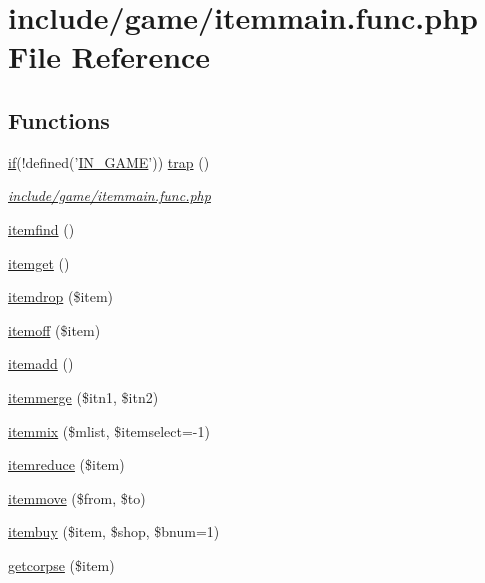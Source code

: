 \hypertarget{itemmain_8func_8php}{\section{include/game/itemmain.func.\+php File Reference}
\label{itemmain_8func_8php}
}
\subsection*{Functions}
\begin{DoxyCompactItemize}
\item 
\hyperlink{login__old_8php_a4ac1118c2e44c513a674bc1793ba6c90}{if}(!defined('\hyperlink{templates_2install_8php_a12c82f3d28569a3f80804f1e72cef14c}{I\+N\+\_\+\+G\+A\+M\+E}')) \hyperlink{itemmain_8func_8php_a6e13da60d00400b7117995078221ba54}{trap} ()
\begin{DoxyCompactList}\small\item\em \hyperlink{itemmain_8func_8php}{include/game/itemmain.\+func.\+php} \end{DoxyCompactList}\item 
\hyperlink{itemmain_8func_8php_a2f25cff29cd69042951430d6d025b735}{itemfind} ()
\item 
\hyperlink{itemmain_8func_8php_a3db0caff9794fe5b1a61004b253b6716}{itemget} ()
\item 
\hyperlink{itemmain_8func_8php_a3fe384a2313ed42cbd884bb60d6f17e9}{itemdrop} (\$item)
\item 
\hyperlink{itemmain_8func_8php_a11d5d22ce85fee9e7c4016d51204bf5e}{itemoff} (\$item)
\item 
\hyperlink{itemmain_8func_8php_a56a47c3720240a87f8405f5564d2bd33}{itemadd} ()
\item 
\hyperlink{itemmain_8func_8php_aa619ead00a9fb485f1594335ee16a473}{itemmerge} (\$itn1, \$itn2)
\item 
\hyperlink{itemmain_8func_8php_a060df3a2049fbc7db8ad6b77d09e4abd}{itemmix} (\$mlist, \$itemselect=-\/1)
\item 
\hyperlink{itemmain_8func_8php_a2ca845e582cd5d785572c8591b1fb6e8}{itemreduce} (\$item)
\item 
\hyperlink{itemmain_8func_8php_aea7bc7f8ad3c88bc775d230ac9d113aa}{itemmove} (\$from, \$to)
\item 
\hyperlink{itemmain_8func_8php_af3e3ec00a37742dd2796565e590a8b5b}{itembuy} (\$item, \$shop, \$bnum=1)
\item 
\hyperlink{itemmain_8func_8php_a88e57f5fcf96fbf8ba3f16b712c76d61}{getcorpse} (\$item)
\end{DoxyCompactItemize}
